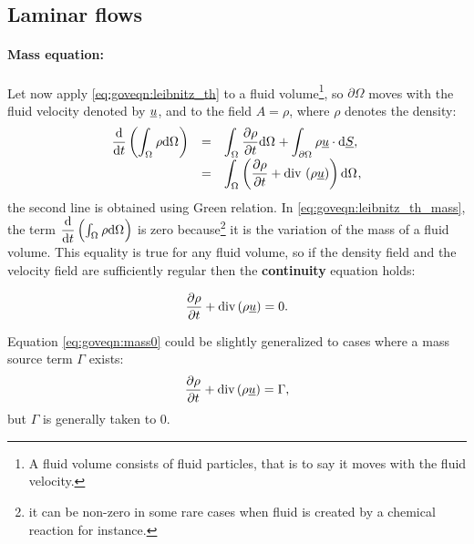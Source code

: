 \subsection{Laminar flows}
\paragraph{Mass equation:}
Let now apply \eqref{eq:goveqn:leibnitz_th} to a fluid volume\footnote{%
A fluid volume consists of fluid particles, that is to say it moves with the fluid velocity.
},
so $\partial \Omega$ moves with the fluid velocity denoted by $\underline{u}$, and to the field
$A= \rho$, where $\rho$ denotes the density:
%
 \begin{equation}\label{eq:goveqn:leibnitz_th_mass}
\begin{array}{r c l}
\displaystyle \dfrac{\mathrm{d} }{\mathrm{d} t} \left( \int_{\Omega_{}} \rho \mathrm{d} \Omega_{}\right) &=&
\displaystyle \int_{\Omega_{}} \dfrac{\partial \rho}{\partial t} \mathrm{d} \Omega_{} + \int_{\partial \Omega_{}} \rho  \underline{u} \cdot  \mathrm{d} \underline{S}, \\
\displaystyle &=&
\displaystyle \int_{\Omega_{ }} \left( \dfrac{\partial \rho}{\partial t} + \text{div}\, \left( \rho \underline{u} \right) \right) \mathrm{d} \Omega_{},
\end{array}
 \end{equation}
the second line is obtained using Green relation. In \eqref{eq:goveqn:leibnitz_th_mass}, the term
$\dfrac{\mathrm{d} }{\mathrm{d} t} \left( \int_{\Omega_{} }\rho \mathrm{d} \Omega_{}\right) $ is zero because\footnote{
it can be non-zero in some rare cases when fluid is created by a chemical reaction for instance.
}
 it is the variation of the mass of a fluid volume. This equality is true for any fluid volume, so
 if the density field and the velocity field are sufficiently regular then the \textbf{continuity} equation holds:

\begin{equation}\label{eq:goveqn:mass0}
\dfrac{\partial \rho}{\partial t} + \text{div}\,(\rho \underline{u})=0.
\end{equation}

Equation \eqref{eq:goveqn:mass0} could be slightly generalized to cases where a mass source term $\Gamma$
exists:
\begin{equation}\label{eq:goveqn:mass}
\dfrac{\partial \rho}{\partial t} + \text{div}\,(\rho \underline{u})=\Gamma,
\end{equation}
but $\Gamma$ is generally taken to $0$.

